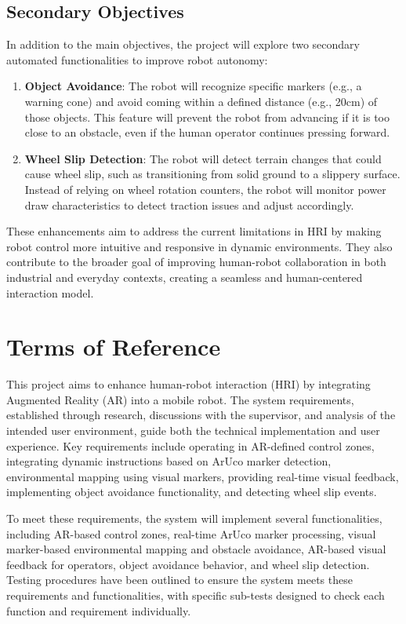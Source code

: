 \subsection{Secondary Objectives}

In addition to the main objectives, the project will explore two secondary automated functionalities to improve robot autonomy:
\begin{enumerate}
    \item \textbf{Object Avoidance}: The robot will recognize specific markers (e.g., a warning cone) and avoid coming within a defined distance (e.g., 20cm) of those objects. This feature will prevent the robot from advancing if it is too close to an obstacle, even if the human operator continues pressing forward.
    \item \textbf{Wheel Slip Detection}: The robot will detect terrain changes that could cause wheel slip, such as transitioning from solid ground to a slippery surface. Instead of relying on wheel rotation counters, the robot will monitor power draw characteristics to detect traction issues and adjust accordingly.
\end{enumerate}


These enhancements aim to address the current limitations in HRI by making robot control more intuitive and responsive in dynamic environments. They also contribute to the broader goal of improving human-robot collaboration in both industrial and everyday contexts, creating a seamless and human-centered interaction model.


\section{\label{sec:terms}Terms of Reference}

This project aims to enhance human-robot interaction (HRI) by integrating Augmented Reality (AR) into a mobile robot. The system requirements, established through research, discussions with the supervisor, and analysis of the intended user environment, guide both the technical implementation and user experience. Key requirements include operating in AR-defined control zones, integrating dynamic instructions based on ArUco marker detection, environmental mapping using visual markers, providing real-time visual feedback, implementing object avoidance functionality, and detecting wheel slip events.

To meet these requirements, the system will implement several functionalities, including AR-based control zones, real-time ArUco marker processing, visual marker-based environmental mapping and obstacle avoidance, AR-based visual feedback for operators, object avoidance behavior, and wheel slip detection. Testing procedures have been outlined to ensure the system meets these requirements and functionalities, with specific sub-tests designed to check each function and requirement individually.

